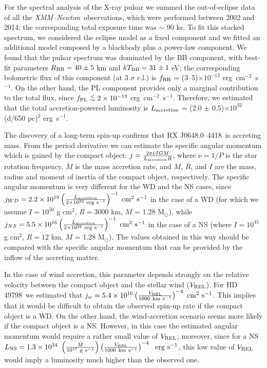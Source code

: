 \documentclass[USenglish,twocolumn]{article}
\def\XMM{{\em XMM--Newton}}
\def\RX{RX J0648.0--4418}
\def\HDone{HD\,49798}
\def\nudot {\dot \nu}
\def\mdot {\dot M}
\def\flux {\mbox{erg cm$^{-2}$ s$^{-1}$}}
\def\lum {\mbox{erg s$^{-1}$}}
\def\ltsima{$\; \buildrel < \over \sim \;$}
\def\lsim{\lower.5ex\hbox{\ltsima}}
\def\msole{M$_{\odot}$}
\begin{document}
For the spectral analysis of the X-ray pulsar we summed the out-of-eclipse data of all the \XMM\ observations, which were performed between 2002 and 2014; the corresponding total exposure time was $\sim$ 90 ks. To fit this stacked spectrum, we considered the eclipse model as a fixed component and we fitted an additional model composed by a blackbody plus a power-law component. We found that the pulsar spectrum was dominated by the BB component, with best-fit parameters $R_{\rm BB} = 40 \pm 5$ km and $kT_{\rm BB} = 31 \pm 1$ eV; the corresponding bolometric flux of this component (at 3 $\sigma$ c.l.) is $f_{\rm BB}$ = (3--5)$\times 10^{-12}$ \flux. On the other hand, the PL component provides only a marginal contribution to the total flux, since $f_{\rm PL} \lsim 2\times 10^{-13}$ \flux. Therefore, we estimated that the total accretion-powered luminosity is $L_{\rm accretion}$ = (2.0 $\pm$ 0.5)$\times 10^{32}$ (d/650 pc)$^{2}$ \lum.

The discovery of a long-term spin-up confirms that \RX\ is accreting mass. From the period derivative we can estimate the specific angular momentum which is gained by the compact object: $j = \frac{2 \pi \nudot I G M} {L_{\rm accretion} R}$, where $\nu = 1/P$ is the star rotation frequency, $\mdot$ is the mass accretion rate, and $M$, $R$, and $I$ are the mass, radius and moment of inertia of the compact object, respectively. The specific angular momentum is very different for the WD and the NS cases, since $j_{WD} = 2.2\times10^{19} \left({L_{\rm accretion}}\over{2\times10^{32}~{\rm erg~s^{-1}}}\right)^{-1} ~{\rm cm^2~s^{-1}}$ in the case of a WD (for which we assume $I = 10^{50}$ g cm$^2$, $R = 3000$ km, $M$ = 1.28 \msole), while $j_{NS} = 5.5\times10^{16} \left({L_{\rm accretion}}\over{2\times10^{32}~{\rm erg~s^{-1}}}\right)^{-1} ~{\rm cm^2~s^{-1}}$ in the case of a NS (where $I = 10^{45}$ g cm$^2$, $R = 12$ km, $M$ = 1.28 \msole). The values obtained in this way should be compared with the specific angular momentum that can be provided by the inflow of the accreting matter.

In the case of wind accretion, this parameter depends strongly on the relative velocity between the compact object and the stellar wind ($V_{\rm REL}$). For \HDone\ we estimated that $j_w = 5.4\times10^{16} \left({V_{\rm REL}}\over{1000 ~{\rm km~s^{-1}}}\right)^{-4} ~{\rm cm^2~s^{-1}}$. This implies that it would be difficult to obtain the observed spin-up rate if the compact object is a WD. On the other hand, the wind-accretion scenario seems more likely if the compact object is a NS. However, in this case the estimated angular momentum would require a rather small value of $V_{\rm REL}$; moreover, since for a NS $L_{\rm NS} = 1.3\times10^{34}~\left({\mdot} \over {{\rm 10^{17}~g~s^{-1}}} \right) \left( {V_{\rm REL}} \over {{\rm 1000~{\rm km~s^{-1}}}} \right)^{-4} ~~{\rm erg~s^{-1}}$, this low value of $V_{\rm REL}$ would imply a luminosity much higher than the observed one.
\end{document}
